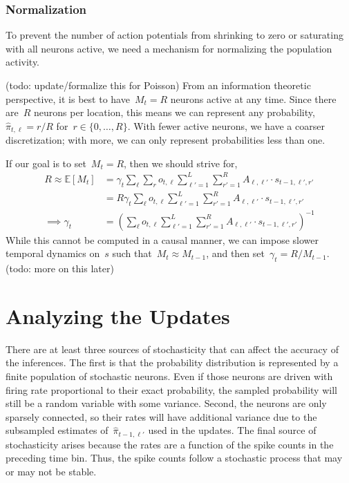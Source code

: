 \subsubsection{Normalization}
To prevent the number of action potentials from shrinking to zero 
or saturating with all neurons active, we need a mechanism for normalizing the 
population activity. 

(todo: update/formalize this for Poisson) From an information theoretic perspective, it is best to
have~${M_t = R}$ neurons active at any time. Since there are~$R$ neurons per location, 
this means we can represent any probability,~${\widehat{\pi}_{t,\ell}=r/R}$ for~$r \in \{0,\ldots,R\}$.
With fewer active neurons, we have a coarser discretization; with more, we can 
only represent probabilities less than one.

If our goal is to set~$M_t=R$, then we should strive for,
\begin{align}
  R \approx \mathbb{E}[M_t] &= \gamma_t \sum_{\ell} \sum_{r} o_{t,\ell} \sum_{\ell'=1}^L \sum_{r'=1}^R A_{\ell, \ell'} \cdot s_{t-1,\ell',r'} \\
  &= R \gamma_t \sum_{\ell} o_{t,\ell} \sum_{\ell'=1}^L \sum_{r'=1}^R A_{\ell, \ell'} \cdot s_{t-1,\ell',r'} \\
\implies \gamma_t &= \left( \sum_{\ell} o_{t,\ell} \sum_{\ell'=1}^L \sum_{r'=1}^R A_{\ell, \ell'} \cdot s_{t-1,\ell',r'} \right)^{-1}
\end{align}
While this cannot be computed in a causal manner, we can impose slower
temporal dynamics on~$s$ such that~$M_{t} \approx M_{t-1}$,
and then set~$\gamma_t = R / M_{t-1}$. (todo: more on this later)

\section{Analyzing the Updates}
There are at least three sources of stochasticity that can affect the
accuracy of the inferences. The first is that the probability
distribution is represented by a finite population of stochastic
neurons. Even if those neurons are driven with firing rate
proportional to their exact probability, the sampled probability will
still be a random variable with some variance. Second, the neurons are
only sparsely connected, so their rates will have additional variance
due to the subsampled estimates of~$\widehat{\pi}_{t-1,\ell'}$ used in
the updates. The final source of stochasticity arises because the
rates are a function of the spike counts in the preceding time bin.
Thus, the spike counts follow a stochastic process that may or may not
be stable.

